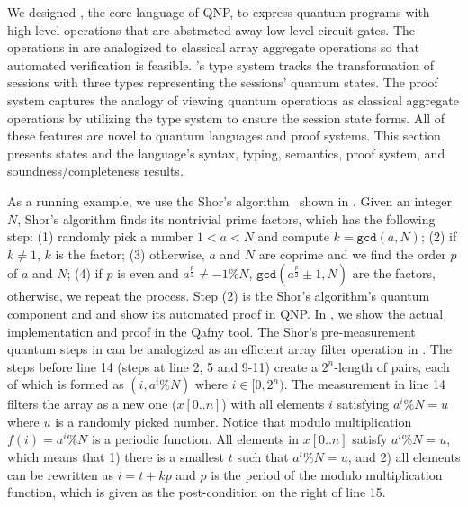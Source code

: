 We designed \qafny, the core language of QNP,
to express quantum programs with
high-level operations that are abstracted away low-level circuit gates.
The operations in \qafny are analogized to classical array 
aggregate operations so that automated verification is feasible.
\qafny's type system tracks the transformation of sessions
with three types representing the sessions' quantum states.
The \qafny proof system captures the analogy of viewing quantum 
operations as classical aggregate operations 
by utilizing the type system to ensure the session state forms.
All of these features are novel to quantum languages and proof systems. 
This section presents \qafny states and the language's syntax, typing, 
semantics, proof system, and soundness/completeness results.  

As a running example, we use the Shor's algorithm~\cite{Shor94} shown in . 
Given an integer $N$, Shor's algorithm finds its nontrivial prime factors, which has the following step: (1) randomly pick a number $1 < a < N$ and compute $k=\texttt{gcd}(a,N)$;
(2) if $k \neq 1$, $k$ is the factor; (3) otherwise, $a$ and $N$ are coprime and we find the order $p$ of $a$ and $N$;
(4) if $p$ is even and $a^{\frac{p}{2}} \neq -1 \% N$, $\texttt{gcd}(a^{\frac{p}{2}}\pm 1,N)$ are the factors, otherwise, we repeat the process. Step (2) is the Shor's algorithm's quantum component and  and  show its automated proof in QNP. In , we show the actual implementation and proof in the Qafny tool.
The Shor's pre-measurement quantum steps in  can be analogized as an efficient array filter operation in .
The steps before line 14 (steps at line 2, 5 and 9-11) create a $2^n$-length of pairs, each of which is formed as $(i,a^i \% N)$ where $i\in [0,2^n)$. The measurement in line 14 filters the array as a new one ($x[0..n]$) with all elements $i$ satisfying $a^i \% N=u$ where $u$ is a randomly picked number. Notice that modulo multiplication $f(i)=a^i\%N$ is a periodic function. All elements in $x[0..n]$ satisfy $a^i \% N=u$, which means that 1) there is a smallest $t$ such that $a^t \% N=u$, and 2) all elements can be rewritten as $i=t+kp$ and $p$ is the period of the modulo multiplication function, which is given as the post-condition on the right of line 15.
